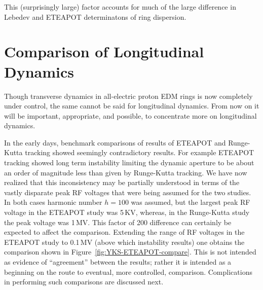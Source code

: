 \documentclass[12]{article}
\begin{document}
This (surprisingly large) factor accounts for much of the large difference
in Lebedev and ETEAPOT determinatons of ring dispersion.

\section{Comparison of Longitudinal Dynamics}
Though transverse dynamics in all-electric proton EDM rings is now 
completely under control, the same cannot be said for longitudinal
dynamics.  From now on it will be important, appropriate, and possible, 
to concentrate more on longitudinal dynamics.  

In the early days, benchmark comparisons of results of ETEAPOT and Runge-Kutta 
tracking showed seemingly contradictory results. For example ETEAPOT 
tracking\cite{Benchmark-III} 
showed long term instability limiting the dynamic aperture
to be about an order of magnitude less than given by Runge-Kutta 
tracking\cite{YKS-tracking}. We have now
realized that this inconsistency may be partially understood in terms of
the vastly disparate peak RF voltages that were being assumed for the
two studies. In both cases harmonic number $h=100$ was assumed, but 
the largest peak RF voltage in the ETEAPOT study was 5\,KV, whereas, 
in the Runge-Kutta study the peak voltage was 1\,MV. 
This factor of 200 difference can certainly be expected to affect the
comparison. Extending the range of RF voltages in the ETEAPOT study 
to 0.1\,MV (above which instability results) one obtains the comparison 
shown in Figure~\ref{fig:YKS-ETEAPOT-compare}. This is not intended
as evidence of ``agreement'' between the results; rather it is intended 
as a beginning on the route to eventual, more controlled, comparison. 
Complications in performing such comparisons are discussed next.
\end{document}
